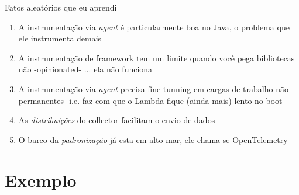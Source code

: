 \documentclass[aspectratio=169]{beamer}
\begin{document}
	
	\begin{frame}{Fatos aleatórios que eu aprendi}
		
		
		\begin{enumerate}
			\item A instrumentação via \textit{agent} é particularmente boa no Java, o problema que ele instrumenta demais
			\item A instrumentação de framework tem um limite quando você pega bibliotecas não -opinionated- ... ela não funciona
			\item A instrumentação via \textit{agent} precisa fine-tunning em cargas de trabalho não permanentes -i.e. faz com que o Lambda fique (ainda mais) lento no boot-
			\item As \textit{distribuições} do collector facilitam o envio de dados
			\item O barco da \textit{padronização} já esta em alto mar, ele chama-se OpenTelemetry
			\end{enumerate}
	\end{frame}
	
	
	{
		\section{Exemplo}
	}
	
\end{document}
